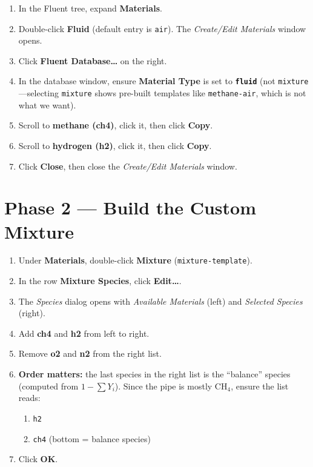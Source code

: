 \documentclass[12pt,a4paper]{report}
\begin{document}
\begin{enumerate}
  \item In the Fluent tree, expand \textbf{Materials}.
  \item Double-click \textbf{Fluid} (default entry is \texttt{air}).
        The \textit{Create/Edit Materials} window opens.
  \item Click \textbf{Fluent Database\ldots} on the right.
  \item In the database window, ensure \textbf{Material Type} is set to
        \textbf{\texttt{fluid}} (not \texttt{mixture}---selecting
        \texttt{mixture} shows pre-built templates like
        \texttt{methane-air}, which is not what we want).
  \item Scroll to \textbf{methane (ch4)}, click it, then click
        \textbf{Copy}.
  \item Scroll to \textbf{hydrogen (h2)}, click it, then click
        \textbf{Copy}.
  \item Click \textbf{Close}, then close the \textit{Create/Edit
        Materials} window.
\end{enumerate}

\section{Phase 2 --- Build the Custom Mixture}

\begin{enumerate}
  \item Under \textbf{Materials}, double-click \textbf{Mixture}
        (\texttt{mixture-template}).
  \item In the row \textbf{Mixture Species}, click \textbf{Edit\ldots}.
  \item The \textit{Species} dialog opens with \textit{Available
        Materials} (left) and \textit{Selected Species} (right).
  \item Add \textbf{ch4} and \textbf{h2} from left to right.
  \item Remove \textbf{o2} and \textbf{n2} from the right list.
  \item \textbf{Order matters:} the last species in the right list is
        the ``balance'' species (computed from $1 - \sum Y_i$).  Since
        the pipe is mostly CH$_4$, ensure the list reads:
        \begin{enumerate}
          \item \texttt{h2}
          \item \texttt{ch4} \quad(bottom = balance species)
        \end{enumerate}
  \item Click \textbf{OK}.
\end{enumerate}
\end{document}
